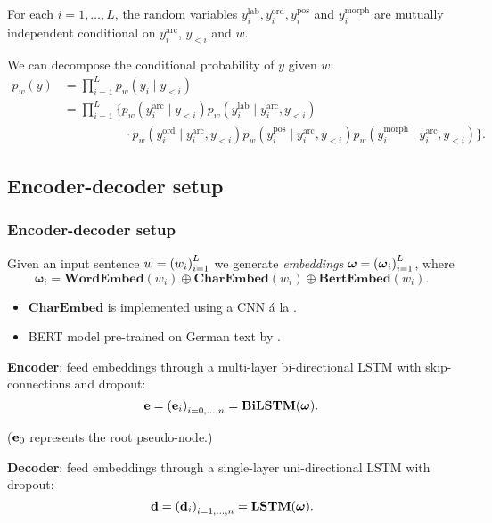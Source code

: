 \documentclass[8pt]{beamer}
\theoremstyle{definition}
\theoremstyle{plain}
\theoremstyle{definition}
\theoremstyle{remark}
\numberwithin{equation}{section}
\numberwithin{figure}{section}
\numberwithin{table}{section}
\begin{document}
\begin{frame}
    \begin{assumption}
        For each \(i = 1, \ldots, L\), the random variables \(y_{i}^{\text{lab}}, y_{i}^{\text{ord}}, y_{i}^{\text{pos}}\) and \(y_{i}^{\text{morph}}\) are mutually independent conditional on \(y_{i}^{\text{arc}}\), \(y_{<i}\) and \(w\).
    \end{assumption}
    We can decompose the conditional probability of \(y\) given \(w\): \\[-1.5em]
    \begin{align*}
        p_{w}(y) &= \prod_{i=1}^{L} p_{w}(y_{i} \mid y_{<i}) \\[-0.5em]
        &= \prod_{i=1}^{L} \Big\{ p_{w}(y_{i}^{\text{arc}} \mid y_{<i}) p_{w}(y_{i}^{\text{lab}} \mid y_{i}^{\text{arc}}, y_{<i}) \\[-2.5em]
        & \phantom{\ = \prod_{i=1}^{L} \Big\{} \cdot p_{w}(y_{i}^{\text{ord}} \mid y_{i}^{\text{arc}}, y_{<i}) p_{w}(y_{i}^{\text{pos}} \mid y_{i}^{\text{arc}}, y_{<i}) p_{w}(y_{i}^{\text{morph}} \mid y_{i}^{\text{arc}}, y_{<i}) \Big\}.
    \end{align*}
\end{frame}

\subsection{Encoder-decoder setup}
\begin{frame}
    \frametitle{Encoder-decoder setup}
    Given an input sentence \(w = \qty(w_{i})_{i=1}^{L}\) we generate \textit{embeddings} \(\boldsymbol{\omega} = \qty(\boldsymbol{\omega}_{i})_{i=1}^{L}\), where
    \[
        \boldsymbol{\omega}_{i} = \mathbf{WordEmbed}(w_{i}) \oplus \mathbf{CharEmbed}(w_{i}) \oplus \mathbf{BertEmbed}(w_{i}).
    \]

    \begin{itemize}
        \item \(\mathbf{CharEmbed}\) is implemented using a CNN á la \textcite{chiu2016named}.
        \item BERT model pre-trained on German text by \textcite{bert-base-german-cased}.
    \end{itemize}

    \textbf{Encoder}: feed embeddings through a multi-layer bi-directional LSTM with skip-connections and dropout:
    \[
        \vb{e} = \qty(\vb{e}_{i})_{i = 0, \ldots, n} = \mathbf{BiLSTM}(\boldsymbol{\omega}).
    \]

    (\(\vb{e}_{0}\) represents the root pseudo-node.)

    \textbf{Decoder}: feed embeddings through a single-layer uni-directional LSTM with dropout:
    \[
        \vb{d} = \qty(\vb{d}_{i})_{i = 1, \ldots, n} = \mathbf{LSTM}(\boldsymbol{\omega}).
    \]

\end{frame}
\end{document}

